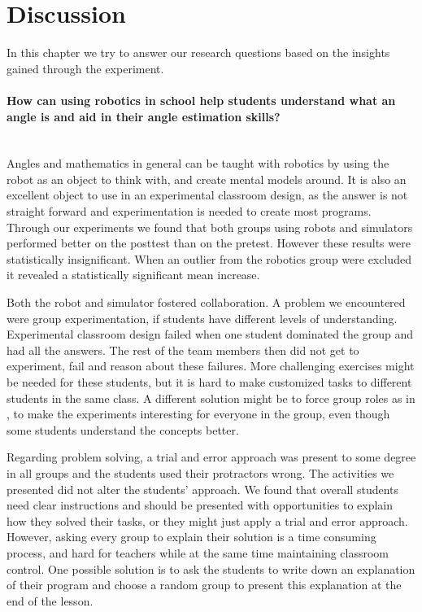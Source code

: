 \section{Discussion}
In this chapter we try to answer our research questions based on the insights gained through the experiment. 

\paragraph{How can using robotics in school help students understand what an angle is and aid in their angle estimation skills?}~\\
Angles and mathematics in general can be taught with robotics by using the robot as an object to think with, and create mental models around. It is also an excellent object to use in an experimental classroom design, as the answer is not straight forward and experimentation is needed to create most programs. Through our experiments we found that both groups using robots and simulators performed better on the posttest than on the pretest. However these results were statistically insignificant. When an outlier from the robotics group were excluded it revealed a statistically significant mean increase. 

\bigskip\noindent
Both the robot and simulator fostered collaboration. A problem we encountered were group experimentation, if students have different levels of understanding. Experimental classroom design failed when one student dominated the group and had all the answers. The rest of the team members then did not get to experiment, fail and reason about these failures. More challenging exercises might be needed for these students, but it is hard to make customized tasks to different students in the same class. A different solution might be to force group roles as in \cite{mitnik2009collaborative}, to make the experiments interesting for everyone in the group, even though some students understand the concepts better.

\bigskip\noindent
Regarding problem solving, a trial and error approach was present to some degree in all groups and the students used their protractors wrong. The activities we presented did not alter the students' approach. We found that overall students need clear instructions and should be presented with opportunities to explain how they solved their tasks, or they might just apply a trial and error approach. However, asking every group to explain their solution is a time consuming process, and hard for teachers while at the same time maintaining classroom control. One possible solution is to ask the students to write down an explanation of their program and choose a random group to present this explanation at the end of the lesson.

